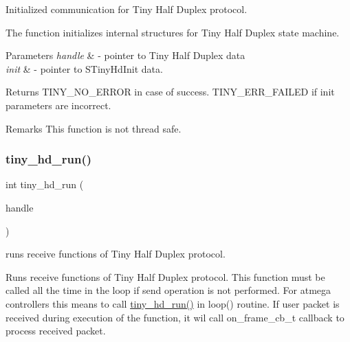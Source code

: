 Initialized communication for Tiny Half Duplex protocol. 

The function initializes internal structures for Tiny Half Duplex state machine.


\begin{DoxyParams}{Parameters}
{\em handle} & -\/ pointer to Tiny Half Duplex data \\
\hline
{\em init} & -\/ pointer to S\+Tiny\+Hd\+Init data. \\
\hline
\end{DoxyParams}
\begin{DoxyReturn}{Returns}
T\+I\+N\+Y\+\_\+\+N\+O\+\_\+\+E\+R\+R\+OR in case of success. T\+I\+N\+Y\+\_\+\+E\+R\+R\+\_\+\+F\+A\+I\+L\+ED if init parameters are incorrect. 
\end{DoxyReturn}
\begin{DoxyRemark}{Remarks}
This function is not thread safe. 
\end{DoxyRemark}
\mbox{\label{group__HALF__DUPLEX__API_gac962595f09883dea1dd0992a608a17b9}} 
\subsubsection{\texorpdfstring{tiny\+\_\+hd\+\_\+run()}{tiny\_hd\_run()}}
{\footnotesize\ttfamily int tiny\+\_\+hd\+\_\+run (\begin{DoxyParamCaption}\item[{\hyperlink{tiny__hd_8h_af9f81ad129b754a780dfca5dcd7f7cf9}{S\+Tiny\+Hd\+Data} $\ast$}]{handle }\end{DoxyParamCaption})}



runs receive functions of Tiny Half Duplex protocol. 

Runs receive functions of Tiny Half Duplex protocol. This function must be called all the time in the loop if send operation is not performed. For atmega controllers this means to call \hyperlink{group__HALF__DUPLEX__API_gac962595f09883dea1dd0992a608a17b9}{tiny\+\_\+hd\+\_\+run()} in loop() routine. If user packet is received during execution of the function, it wil call on\+\_\+frame\+\_\+cb\+\_\+t callback to process received packet.


